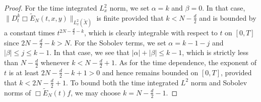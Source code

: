 \documentclass[11pt,letterpaper,oneside]{amsart}
\theoremstyle{definition}
\theoremstyle{remark}
\newcommand{\wt}{\widetilde}
\theoremstyle{definition}
\theoremstyle{remark}
\begin{document}
\begin{proof}
    \medskip
    
    For the time integrated $L_x^2$ norm, we set $\alpha = k$ and $\beta = 0$. In that case, $\|D_t^k \Box \wt E_N(t,x,y)\|_{L_x^2(\wt X)}$ is finite provided that $k < N - \frac{d}{2}$ and is bounded by a constant times $t^{2N - \frac{d}{2} - k}$, which is clearly integrable with respect to $t$ on $[0,T]$ since $2N - \frac{d}{2} - k > N$. For the Sobolev terms, we set $\alpha = k - 1 - j$ and $|\beta| \leq j \leq k - 1$. In that case, we see that $|\alpha| + |\beta| \leq k - 1$, which is strictly less than $N - \frac{d}{2}$ whenever $k < N - \frac{d}{2} + 1$. As for the time dependence, the exponent of $t$ is at least $2N - \frac{d}{2} - k + 1 >0$ and hence remains bounded on $[0,T]$, provided that $k < 2N - \frac{d}{2} + 1$. To bound both the time integrated $L^2$ norm and Sobolev norms of $\Box \wt E_N(t) f$, we may choose $k = N - \frac{d}{2} - 1$.
    
    \medskip
    

\end{proof}
\end{document}
